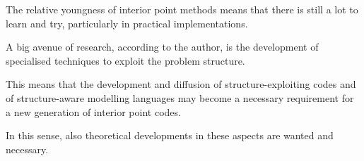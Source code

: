
%
%
\label{ch:Conclusions}

The relative youngness of interior point methods means that there is still
a lot to learn and try, particularly in practical implementations.

A big avenue of research, according to the author, is the development
of specialised techniques to exploit the problem structure.

This means that the development and diffusion of structure-exploiting
codes and of structure-aware modelling languages may become a necessary
requirement for a new generation of interior point codes.

In this sense, also theoretical developments in these aspects are 
wanted and necessary.
